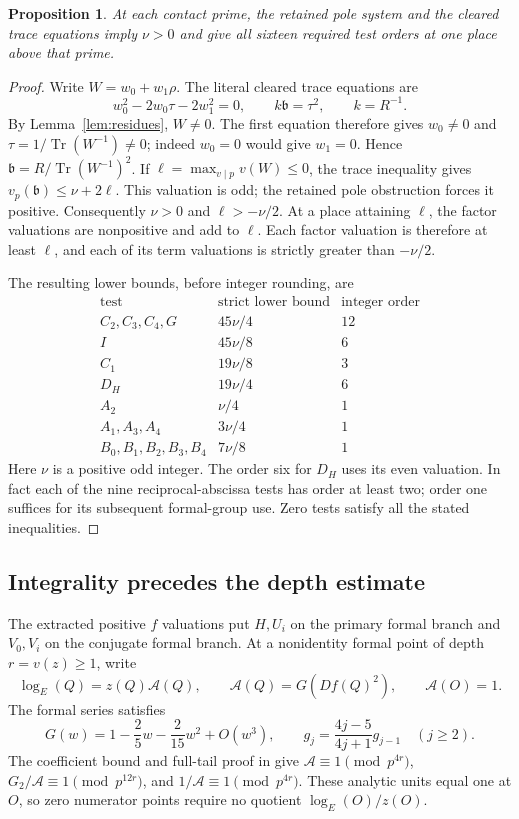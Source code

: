 \documentclass[11pt,a4paper]{article}
\newtheorem{proposition}[theorem]{Proposition}
\DeclareMathOperator{\Tr}{Tr}\DeclareMathOperator{\Nm}{Nm}
\begin{document}
\begin{proposition}\label{prop:extract}
At each contact prime, the retained pole system and the cleared trace
equations imply $\nu>0$ and give all sixteen required test orders at
one place above that prime.
\end{proposition}
\begin{proof}
Write $W=w_0+w_1\rho$. The literal cleared trace equations are
\[
 w_0^2-2w_0\tau-2w_1^2=0,\qquad k\mathfrak b=\tau^2,\qquad k=R^{-1}.
\]
By Lemma~\ref{lem:residues}, $W\ne0$. The first equation therefore
gives $w_0\ne0$ and $\tau=1/\Tr(W^{-1})\ne0$; indeed $w_0=0$
would give $w_1=0$. Hence
$\mathfrak b=R/\Tr(W^{-1})^2$. If
$\ell=\max_{v\mid p}v(W)\le0$, the trace inequality gives
$v_p(\mathfrak b)\le\nu+2\ell$.
This valuation is odd; the retained pole obstruction forces it positive.
Consequently $\nu>0$ and $\ell>-\nu/2$.
At a place attaining $\ell$, the factor valuations are nonpositive
and add to $\ell$. Each factor valuation is therefore at least $\ell$,
and each of its term valuations is strictly greater than $-\nu/2$.

The resulting lower bounds, before integer rounding, are
\[
\begin{array}{c|c|c}
\text{test}&\text{strict lower bound}&\text{integer order}\\\hline
C_2,C_3,C_4,G&45\nu/4&12\\
I&45\nu/8&6\\
C_1&19\nu/8&3\\
D_H&19\nu/4&6\\
A_2&\nu/4&1\\
A_1,A_3,A_4&3\nu/4&1\\
B_0,B_1,B_2,B_3,B_4&7\nu/8&1
\end{array}
\]
Here $\nu$ is a positive odd integer. The order six for $D_H$ uses
its even valuation. In fact each of the nine reciprocal-abscissa
tests has order at least two; order one suffices for its subsequent
formal-group use. Zero tests satisfy all the stated inequalities.
\end{proof}

\subsection{Integrality precedes the depth estimate}
The extracted positive $f$ valuations put $H,U_i$ on the primary
formal branch and $V_0,V_i$ on the conjugate formal branch.
At a nonidentity formal point of depth $r=v(z)\ge1$, write
\[
 \log_E(Q)=z(Q)\mathcal A(Q),\qquad
 \mathcal A(Q)=G(Df(Q)^2),\qquad \mathcal A(O)=1.
\]
The formal series satisfies
\[
 G(w)=1-\frac25w-\frac2{15}w^2+O(w^3),\qquad
 g_j=\frac{4j-5}{4j+1}g_{j-1}\quad(j\ge2).
\]
The coefficient bound and full-tail proof in \cite[Lemma 3.1]{Even}
give $\mathcal A\equiv1\pmod{p^{4r}}$,
$G_2/\mathcal A\equiv1\pmod{p^{12r}}$, and
$1/\mathcal A\equiv1\pmod{p^{4r}}$.
These analytic units equal one at $O$, so zero numerator points
require no quotient $\log_E(O)/z(O)$.
\end{document}
